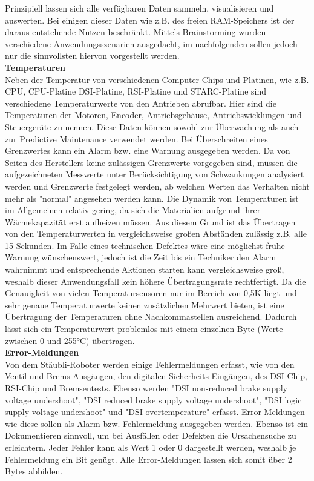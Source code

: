 \documentclass[ a4paper,
                oneside,
                toc=bibliography,
                toc=listof
                ]{scrbook}
\begin{document}
 	Prinzipiell lassen sich alle verfügbaren Daten sammeln, visualisieren und auswerten. Bei einigen dieser Daten wie z.B. des freien RAM-Speichers ist der daraus entstehende Nutzen beschränkt.	Mittels Brainstorming wurden verschiedene Anwendungsszenarien ausgedacht, im nachfolgenden sollen jedoch nur die sinnvollsten hiervon vorgestellt werden.\\
 	\textbf{Temperaturen}\\
 	Neben der Temperatur von verschiedenen Computer-Chips und Platinen, wie z.B. CPU, CPU-Platine DSI-Platine, RSI-Platine und STARC-Platine sind verschiedene Temperaturwerte von den Antrieben abrufbar. Hier sind die Temperaturen der Motoren, Encoder, Antriebsgehäuse,  Antriebswicklungen und  Steuergeräte zu nennen. Diese Daten können sowohl zur Überwachung als auch zur Predictive Maintenance verwendet werden. Bei Überschreiten eines Grenzwertes kann ein Alarm bzw. eine Warnung ausgegeben werden. Da von Seiten des Herstellers keine zulässigen Grenzwerte vorgegeben sind, müssen die aufgezeichneten Messwerte unter Berücksichtigung von Schwankungen analysiert werden und Grenzwerte festgelegt werden, ab welchen Werten das Verhalten nicht mehr als "normal" angesehen werden kann. Die Dynamik von Temperaturen ist im Allgemeinen relativ gering, da sich die Materialien aufgrund ihrer Wärmekapazität erst aufheizen müssen. Aus diesem Grund ist das Übertragen von den Temperaturwerten in vergleichsweise großen Abständen zulässig z.B. alle 15 Sekunden. Im Falle eines technischen Defektes wäre eine möglichst frühe Warnung wünschenswert, jedoch ist die Zeit bis ein Techniker den Alarm wahrnimmt und entsprechende Aktionen starten kann vergleichsweise groß, weshalb dieser Anwendungsfall kein höhere Übertragungsrate rechtfertigt. Da die Genauigkeit von vielen Temperatursensoren nur im Bereich von 0,5K liegt und sehr genaue Temperaturwerte keinen zusätzlichen Mehrwert bieten, ist eine Übertragung der Temperaturen ohne Nachkommastellen ausreichend. Dadurch lässt sich ein Temperaturwert problemlos mit einem einzelnen Byte (Werte zwischen 0 und 255°C) übertragen.\\
 	\textbf{Error-Meldungen}\\
 	Von dem Stäubli-Roboter werden einige Fehlermeldungen erfasst, wie von den Ventil und Brems-Ausgängen, den digitalen Sicherheits-Eingängen, des DSI-Chip, RSI-Chip und Bremsentests. Ebenso werden "DSI non-reduced brake supply voltage undershoot",  "DSI reduced brake supply voltage undershoot", "DSI logic supply voltage undershoot" und "DSI overtemperature" erfasst. Error-Meldungen wie diese sollen als Alarm bzw. Fehlermeldung ausgegeben werden. Ebenso ist ein Dokumentieren sinnvoll, um bei Ausfällen oder Defekten die Ursachensuche zu erleichtern. Jeder Fehler kann als Wert 1 oder 0 dargestellt werden, weshalb je Fehlermeldung ein Bit genügt. Alle Error-Meldungen lassen sich somit über 2 Bytes abbilden.\\
\end{document}

